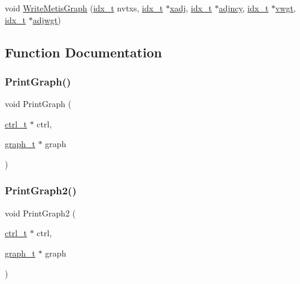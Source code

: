 \begin{DoxyCompactItemize}
\item 
void \hyperlink{a00885_a980321d683a314be4d63895acec4a8fc}{Write\+Metis\+Graph} (\hyperlink{a00876_aaa5262be3e700770163401acb0150f52}{idx\+\_\+t} nvtxs, \hyperlink{a00876_aaa5262be3e700770163401acb0150f52}{idx\+\_\+t} $\ast$\hyperlink{a00879_aa8fc7f75458e38e1e2979ed6db639164}{xadj}, \hyperlink{a00876_aaa5262be3e700770163401acb0150f52}{idx\+\_\+t} $\ast$\hyperlink{a00879_a20c068e3ebdd8f9889fb82c1f677d679}{adjncy}, \hyperlink{a00876_aaa5262be3e700770163401acb0150f52}{idx\+\_\+t} $\ast$\hyperlink{a00879_a34203f1160d94eca83e95f2718ea3504}{vwgt}, \hyperlink{a00876_aaa5262be3e700770163401acb0150f52}{idx\+\_\+t} $\ast$\hyperlink{a00879_a2be4719baa820cfa5c06fd070796e0d3}{adjwgt})
\end{DoxyCompactItemize}


\subsection{Function Documentation}
\mbox{\label{a00885_a26a1678e698df9936cef89e68523aff9}} 
\subsubsection{\texorpdfstring{Print\+Graph()}{PrintGraph()}}
{\footnotesize\ttfamily void Print\+Graph (\begin{DoxyParamCaption}\item[{\hyperlink{a00742}{ctrl\+\_\+t} $\ast$}]{ctrl,  }\item[{\hyperlink{a00734}{graph\+\_\+t} $\ast$}]{graph }\end{DoxyParamCaption})}

\mbox{\label{a00885_aefc3e7d2366568c45192419c7beebd48}} 
\subsubsection{\texorpdfstring{Print\+Graph2()}{PrintGraph2()}}
{\footnotesize\ttfamily void Print\+Graph2 (\begin{DoxyParamCaption}\item[{\hyperlink{a00742}{ctrl\+\_\+t} $\ast$}]{ctrl,  }\item[{\hyperlink{a00734}{graph\+\_\+t} $\ast$}]{graph }\end{DoxyParamCaption})}

